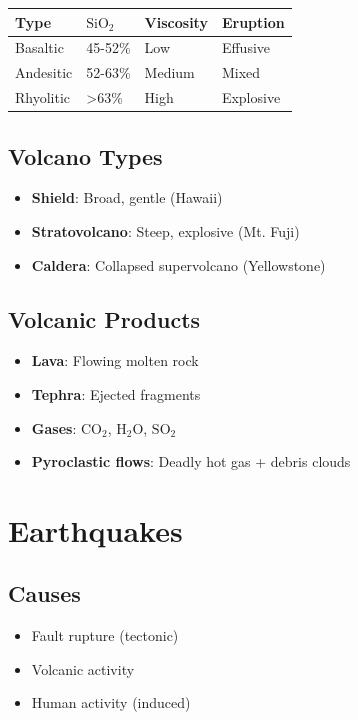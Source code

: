 \documentclass[
  11pt,
  letterpaper,
  twoside,
  openright]{book}
\providecommand{\tightlist}{%
  \setlength{\itemsep}{0pt}\setlength{\parskip}{0pt}}
\begin{document}
\begin{longtable}[]{@{}llll@{}}
\toprule\noalign{}
Type & \(\text{SiO}_2\) & Viscosity & Eruption \\
\midrule\noalign{}
\endhead
\bottomrule\noalign{}
\endlastfoot
Basaltic & 45-52\% & Low & Effusive \\
Andesitic & 52-63\% & Medium & Mixed \\
Rhyolitic & \textgreater63\% & High & Explosive \\
\end{longtable}

\subsection{Volcano Types}\label{volcano-types}

\begin{itemize}
\tightlist
\item
  \textbf{Shield}: Broad, gentle (Hawaii)
\item
  \textbf{Stratovolcano}: Steep, explosive (Mt. Fuji)
\item
  \textbf{Caldera}: Collapsed supervolcano (Yellowstone)
\end{itemize}

\subsection{Volcanic Products}\label{volcanic-products}

\begin{itemize}
\tightlist
\item
  \textbf{Lava}: Flowing molten rock
\item
  \textbf{Tephra}: Ejected fragments
\item
  \textbf{Gases}: \(\text{CO}_2\), \(\text{H}_2\text{O}\),
  \(\text{SO}_2\)
\item
  \textbf{Pyroclastic flows}: Deadly hot gas + debris clouds
\end{itemize}

\section{Earthquakes}\label{earthquakes}

\subsection{Causes}\label{causes}

\begin{itemize}
\tightlist
\item
  Fault rupture (tectonic)
\item
  Volcanic activity
\item
  Human activity (induced)
\end{itemize}
\end{document}
